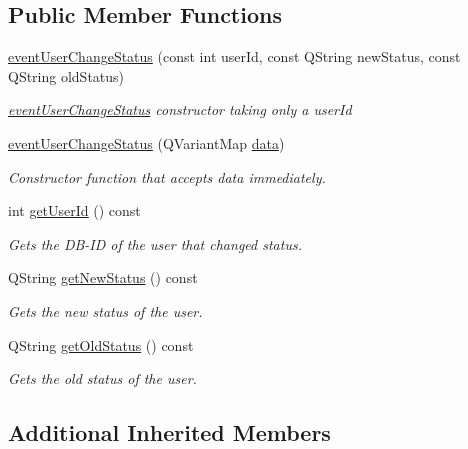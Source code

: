 \subsection*{Public Member Functions}
\begin{DoxyCompactItemize}
\item 
\hyperlink{classshared_1_1events_1_1event_user_change_status_ac46b3eaa016315086bd75441ac1b7122}{event\-User\-Change\-Status} (const int user\-Id, const Q\-String new\-Status, const Q\-String old\-Status)
\begin{DoxyCompactList}\small\item\em \hyperlink{classshared_1_1events_1_1event_user_change_status}{event\-User\-Change\-Status} constructor taking only a user\-Id \end{DoxyCompactList}\item 
\hyperlink{classshared_1_1events_1_1event_user_change_status_a70327cca0345cdbbb7ba5e2c9daeae97}{event\-User\-Change\-Status} (Q\-Variant\-Map \hyperlink{classshared_1_1events_1_1cls_event_a6cfb6b96d72fc1e7a101e61061ec2755}{data})
\begin{DoxyCompactList}\small\item\em Constructor function that accepts data immediately. \end{DoxyCompactList}\item 
int \hyperlink{classshared_1_1events_1_1event_user_change_status_a4c904f38f1ff994ebb9a9ec251604874}{get\-User\-Id} () const 
\begin{DoxyCompactList}\small\item\em Gets the D\-B-\/\-I\-D of the user that changed status. \end{DoxyCompactList}\item 
Q\-String \hyperlink{classshared_1_1events_1_1event_user_change_status_a018d111b0b5b957754b20d777f7f1bef}{get\-New\-Status} () const 
\begin{DoxyCompactList}\small\item\em Gets the new status of the user. \end{DoxyCompactList}\item 
Q\-String \hyperlink{classshared_1_1events_1_1event_user_change_status_a8c1539833c6073962215c8d02617a324}{get\-Old\-Status} () const 
\begin{DoxyCompactList}\small\item\em Gets the old status of the user. \end{DoxyCompactList}\end{DoxyCompactItemize}
\subsection*{Additional Inherited Members}


